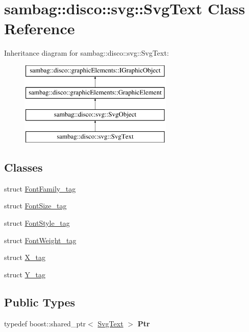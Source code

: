 \hypertarget{classsambag_1_1disco_1_1svg_1_1_svg_text}{
\section{sambag::disco::svg::SvgText Class Reference}
\label{classsambag_1_1disco_1_1svg_1_1_svg_text}
}
Inheritance diagram for sambag::disco::svg::SvgText:\begin{figure}[H]
\begin{center}
\leavevmode
\includegraphics[height=4.000000cm]{classsambag_1_1disco_1_1svg_1_1_svg_text}
\end{center}
\end{figure}
\subsection*{Classes}
\begin{DoxyCompactItemize}
\item 
struct \hyperlink{structsambag_1_1disco_1_1svg_1_1_svg_text_1_1_font_family__tag}{FontFamily\_\-tag}
\item 
struct \hyperlink{structsambag_1_1disco_1_1svg_1_1_svg_text_1_1_font_size__tag}{FontSize\_\-tag}
\item 
struct \hyperlink{structsambag_1_1disco_1_1svg_1_1_svg_text_1_1_font_style__tag}{FontStyle\_\-tag}
\item 
struct \hyperlink{structsambag_1_1disco_1_1svg_1_1_svg_text_1_1_font_weight__tag}{FontWeight\_\-tag}
\item 
struct \hyperlink{structsambag_1_1disco_1_1svg_1_1_svg_text_1_1_x__tag}{X\_\-tag}
\item 
struct \hyperlink{structsambag_1_1disco_1_1svg_1_1_svg_text_1_1_y__tag}{Y\_\-tag}
\end{DoxyCompactItemize}
\subsection*{Public Types}
\begin{DoxyCompactItemize}
\item 
\hypertarget{classsambag_1_1disco_1_1svg_1_1_svg_text_a308df1e62790016f39c4f9ff808d0a26}{
typedef boost::shared\_\-ptr$<$ \hyperlink{classsambag_1_1disco_1_1svg_1_1_svg_text}{SvgText} $>$ {\bfseries Ptr}}
\label{classsambag_1_1disco_1_1svg_1_1_svg_text_a308df1e62790016f39c4f9ff808d0a26}

\end{DoxyCompactItemize}
